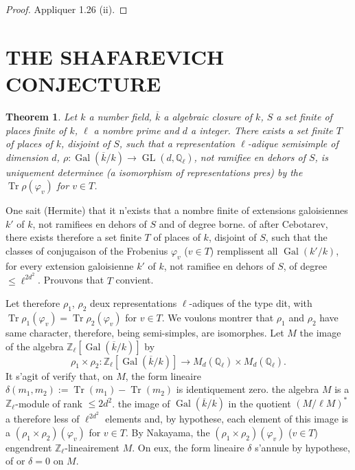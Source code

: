 \documentclass[12pt,a4paper]{article}
\theoremstyle{plain}
\newtheorem{theorem}{Theorem}[section]
\theoremstyle{definition}
\theoremstyle{remark}
\DeclareMathOperator{\Gal}{Gal}
\DeclareMathOperator{\GL}{GL}
\DeclareMathOperator{\Tr}{Tr}
\newcommand{\QQ}{\mathbb{Q}}
\newcommand{\ZZ}{\mathbb{Z}}
\providecommand{\QQ}{\mathbb{Q}}
\providecommand{\ZZ}{\mathbb{Z}}
\providecommand{\Gal}{\operatorname{Gal}}
\providecommand{\GL}{\operatorname{GL}}
\providecommand{\Tr}{\operatorname{Tr}}
\begin{document}
\begin{proof}
Appliquer 1.26 (ii).
\end{proof}


\section{THE SHAFAREVICH CONJECTURE}

\begin{theorem}
Let $k$ a number field, $\overline{k}$ a algebraic closure of $k$, $S$ a set finite of places finite of $k$, $\ell$ a nombre prime and $d$ a integer. There exists a set finite $T$ of places of $k$, disjoint of $S$, such that a representation $\ell$-adique semisimple of dimension $d$, $\rho : \Gal(\overline{k}/k) \to \GL(d, \QQ_\ell)$, not ramifiee en dehors of $S$, is uniquement determinee (a isomorphism of representations pres) by the $\Tr \rho(\varphi_v)$ for $v \in T$.
\end{theorem}

One sait (Hermite) that it n'exists that a nombre finite of extensions galoisiennes $k'$ of $k$, not ramifiees en dehors of $S$ and of degree borne. of after Cebotarev, there exists therefore a set finite $T$ of places of $k$, disjoint of $S$, such that the classes of conjugaison of the Frobenius $\varphi_v$ ($v \in T$) remplissent all $\Gal(k'/k)$, for every extension galoisienne $k'$ of $k$, not ramifiee en dehors of $S$, of degree $\leq \ell^{2d^2}$. Prouvons that $T$ convient.

Let therefore $\rho_1$, $\rho_2$ deux representations $\ell$-adiques of the type dit, with $\Tr \rho_1(\varphi_v) = \Tr \rho_2(\varphi_v)$ for $v \in T$. We voulons montrer that $\rho_1$ and $\rho_2$ have same character, therefore, being semi-simples, are isomorphes. Let $M$ the image of the algebra $\ZZ_\ell[\Gal(\overline{k}/k)]$ by
\[
\rho_1 \times \rho_2 : \ZZ_\ell[\Gal(\overline{k}/k)] \longrightarrow M_d(\QQ_\ell) \times M_d(\QQ_\ell).
\]
It s'agit of verify that, on $M$, the form lineaire $\delta(m_1, m_2) := \Tr(m_1) - \Tr(m_2)$ is identiquement zero. the algebra $M$ is a $\ZZ_\ell$-module of rank $\leq 2d^2$. the image of $\Gal(\overline{k}/k)$ in the quotient $(M/\ell M)^*$ a therefore less of $\ell^{2d^2}$ elements and, by hypothese, each element of this image is a $(\rho_1 \times \rho_2)(\varphi_v)$ for $v \in T$. By Nakayama, the $(\rho_1 \times \rho_2)(\varphi_v)$ ($v \in T$) engendrent $\ZZ_\ell$-lineairement $M$. On eux, the form lineaire $\delta$ s'annule by hypothese, of or $\delta = 0$ on $M$.
\end{document}
